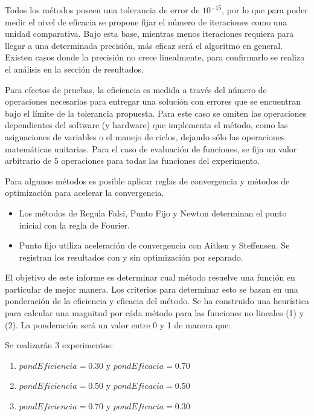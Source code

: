 \documentclass{memoria}
\begin{document}

    Todos los métodos poseen una tolerancia de error de $10^{-15}$, por lo que para poder medir el nivel de eficacia se propone fijar el número de iteraciones como una unidad comparativa. Bajo esta base, mientras menos iteraciones requiera para llegar a una determinada precisión, más eficaz será el algoritmo en general. Existen casos donde la precisión no crece linealmente, para confirmarlo se realiza el análisis en la sección de resultados.


    Para efectos de pruebas, la eficiencia es medida a través del número de operaciones necesarias para entregar una solución con errores que se encuentran bajo el límite de la tolerancia propuesta. Para este caso se omiten las operaciones dependientes del software (y hardware) que implementa el método, como las asignaciones de variables o el manejo de ciclos, dejando sólo las operaciones matemáticas unitarias. Para el caso de evaluación de funciones, se fija un valor arbitrario de 5 operaciones para todas las funciones del experimento.
    


Para algunos métodos es posible aplicar reglas de convergencia y métodos de optimización para acelerar la convergencia.

\begin{itemize}
    \item Los métodos de Regula Falsi, Punto Fijo y Newton determinan el punto inicial con la regla de Fourier. 
    \item Punto fijo utiliza aceleración de convergencia con Aitken y Steffensen. Se registran los resultados con y sin optimización por separado.
\end{itemize}

    El objetivo de este informe es determinar cual método resuelve una función en particular de mejor manera. Los criterios para determinar esto se basan en una ponderación de la eficiencia y eficacia del método. Se ha construido una heurística para calcular una magnitud por cáda método para las funciones no lineales (1) y (2). La ponderación será un valor entre 0 y 1 de manera que:
    
    Se realizarán 3 experimentos:
    \begin{enumerate} 
        \item $pondEficiencia = 0.30$ y $pondEficacia = 0.70$
        \item $pondEficiencia = 0.50$ y $pondEficacia = 0.50$
        \item $pondEficiencia = 0.70$ y $pondEficacia = 0.30$
    \end{enumerate}
\end{document}
